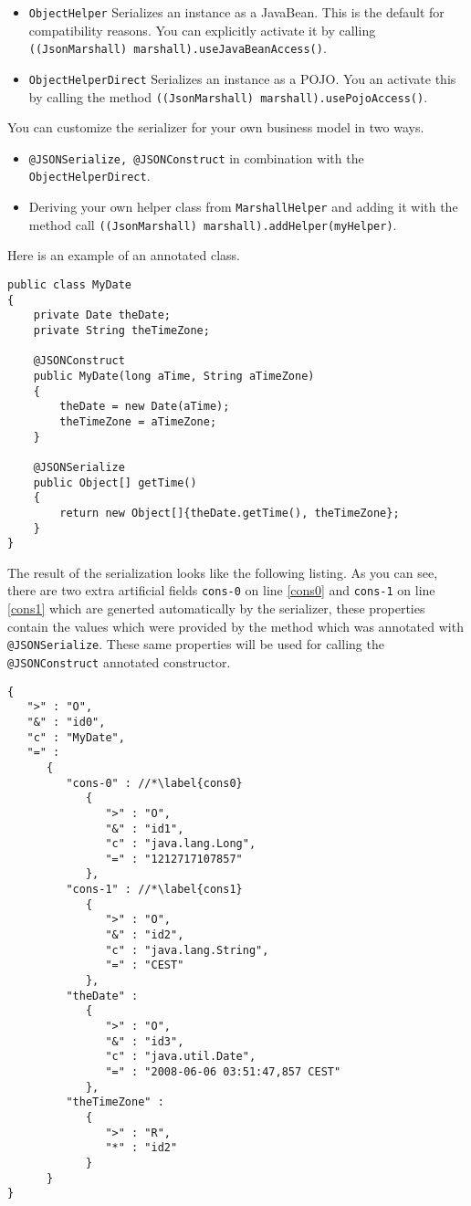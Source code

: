 \documentclass[a4paper]{article}
\begin{document}
\begin{itemize}
   \item \lstinline{ObjectHelper} Serializes an instance as a JavaBean. This is the default for compatibility reasons. You can explicitly activate it by calling \lstinline{((JsonMarshall) marshall).useJavaBeanAccess()}.
   \item \lstinline{ObjectHelperDirect} Serializes an instance as a POJO. You an activate this by calling the method \lstinline{((JsonMarshall) marshall).usePojoAccess()}.
\end{itemize}

You can customize the serializer for your own business model in two ways.

\begin{itemize}
   \item \lstinline{@JSONSerialize, @JSONConstruct} in combination with the \lstinline{ObjectHelperDirect}.
   \item Deriving your own helper class from \lstinline{MarshallHelper} and adding it with the method call  \lstinline{((JsonMarshall) marshall).addHelper(myHelper)}.
\end{itemize}

Here is an example of an annotated class.

\begin{lstlisting}
public class MyDate
{
    private Date theDate;
    private String theTimeZone;

    @JSONConstruct
    public MyDate(long aTime, String aTimeZone)
    {
        theDate = new Date(aTime);
        theTimeZone = aTimeZone;
    }

    @JSONSerialize
    public Object[] getTime()
    {
        return new Object[]{theDate.getTime(), theTimeZone};
    }
}
\end{lstlisting}

The result of the serialization looks like the following listing. As you can see, there are two extra artificial fields \lstinline{cons-0} on line \ref{cons0} and \lstinline{cons-1} on line \ref{cons1} which are generted automatically by the serializer, these properties contain the values which were provided by the method which was annotated with \lstinline{@JSONSerialize}. These same properties will be used for calling the \lstinline{@JSONConstruct} annotated constructor.

\begin{lstlisting}
{
   ">" : "O",
   "&" : "id0",
   "c" : "MyDate",
   "=" :
      {
         "cons-0" : //*\label{cons0}
            {
               ">" : "O",
               "&" : "id1",
               "c" : "java.lang.Long",
               "=" : "1212717107857"
            },
         "cons-1" : //*\label{cons1}
            {
               ">" : "O",
               "&" : "id2",
               "c" : "java.lang.String",
               "=" : "CEST"
            },
         "theDate" :
            {
               ">" : "O",
               "&" : "id3",
               "c" : "java.util.Date",
               "=" : "2008-06-06 03:51:47,857 CEST"
            },
         "theTimeZone" :
            {
               ">" : "R",
               "*" : "id2"
            }
      }
}
\end{lstlisting}
\end{document}
